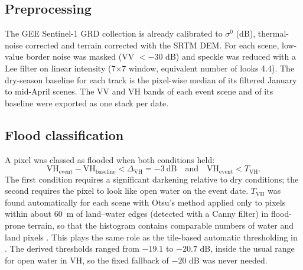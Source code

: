 \documentclass[11pt,a4paper]{article}
\begin{document}
\subsection{Preprocessing}
The GEE Sentinel-1 GRD collection is already calibrated to $\sigma^0$ (dB), thermal-noise corrected and
terrain corrected with the SRTM DEM. For each scene, low-value border noise was masked
(VV $< -30$ dB) and speckle was reduced with a Lee filter \cite{lee} on linear intensity
(7$\times$7 window, equivalent number of looks 4.4). The dry-season baseline for each track is the
pixel-wise median of its filtered January to mid-April scenes. The VV and VH bands of each event
scene and of its baseline were exported as one stack per date.

\subsection{Flood classification}
A pixel was classed as flooded when both conditions held:
\begin{equation}
\mathrm{VH}_{\text{event}} - \mathrm{VH}_{\text{baseline}} < \Delta_{\text{VH}} = -3\ \text{dB}
\quad\text{and}\quad
\mathrm{VH}_{\text{event}} < T_{\text{VH}} .
\end{equation}
The first condition requires a significant darkening relative to dry conditions; the second requires the
pixel to look like open water on the event date. $T_{\text{VH}}$ was found automatically for each scene
with Otsu's method applied only to pixels within about \SI{60}{m} of land--water edges (detected with a
Canny filter) in flood-prone terrain, so that the histogram contains comparable numbers of water and land
pixels \cite{donchyts}. This plays the same role as the tile-based automatic thresholding in
\cite{twele}. The derived thresholds ranged from $-19.1$ to $-20.7$ dB, inside the usual range for open
water in VH, so the fixed fallback of $-20$ dB was never needed.
\end{document}
